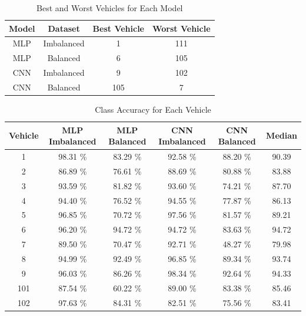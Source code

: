 \documentclass[10pt]{article}
\begin{document}
\begin{table}
    \caption*{Best and Worst Vehicles for Each Model}
    \centering
    \begin{tabular}{|c|c|c|c|}
    \hline
    \textbf{Model} & \textbf{Dataset} & \textbf{Best Vehicle} & \textbf{Worst Vehicle} \\
    \hline
    MLP & Imbalanced & 1   & 111 \\
    MLP & Balanced   & 6   & 105 \\
    CNN & Imbalanced & 9   & 102 \\
    CNN & Balanced   & 105 & 7   \\
    \hline
    \end{tabular}
\end{table}

\begin{table}
    \caption*{Class Accuracy for Each Vehicle}
    \centering
    \begin{tabular}{|c|c|c|c|c|c|}
    \hline
    \textbf{Vehicle} & \textbf{MLP Imbalanced} & \textbf{MLP Balanced} & \textbf{CNN Imbalanced} & \textbf{CNN Balanced} & \textbf{Median} \\
    \hline
    1 & \cellcolor{green}98.31 \% & \cellcolor{red}83.29 \% & 92.58 \% & 88.20 \% & 90.39 \\
    2 & 86.89 \% & \cellcolor{red}76.61 \% & \cellcolor{green}88.69 \% & 80.88 \% & 83.88 \\
    3 & 93.59 \% & 81.82 \% & \cellcolor{green}93.60 \% & \cellcolor{red}74.21 \% & 87.70 \\
    4 & 94.40 \% & \cellcolor{red}76.52 \% & \cellcolor{green}94.55 \% & 77.87 \% & 86.13 \\
    5 & 96.85 \% & \cellcolor{red}70.72 \% & \cellcolor{green}97.56 \% & 81.57 \% & 89.21 \\
    6 & \cellcolor{green}96.20 \% & 94.72 \% & 94.72 \% & \cellcolor{red}83.63 \% & 94.72 \\
    7 & 89.50 \% & 70.47 \% & \cellcolor{green}92.71 \% & \cellcolor{red}48.27 \% & 79.98 \\
    8 & 94.99 \% & 92.49 \% & \cellcolor{green}96.85 \% & \cellcolor{red}89.34 \% & 93.74 \\
    9 & 96.03 \% & \cellcolor{red}86.26 \% & \cellcolor{green}98.34 \% & 92.64 \% & 94.33 \\
    101 & 87.54 \% & \cellcolor{red}60.22 \% & \cellcolor{green}89.00 \% & 83.38 \% & 85.46 \\
    102 & \cellcolor{green}97.63 \% & 84.31 \% & 82.51 \% & \cellcolor{red}75.56 \% & 83.41 \\

\end{tabular}
\end{table}
\end{document}
